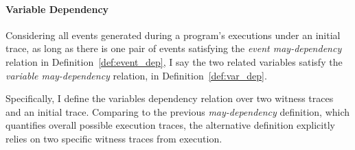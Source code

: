 \paragraph*{Variable Dependency}
{Considering 
all events generated during a program's executions
under an initial trace,
as long as there is one pair of events satisfying the \emph{event may-dependency} relation in Definition~\ref{def:event_dep}, 
 I say the two 
related
variables satisfy the \emph{variable may-dependency} relation, in Definition~\ref{def:var_dep}.
}
\begin{defn}
    \label{def:var_dep}
    \end{defn}
    Specifically, I define the variables dependency relation over two witness traces and an initial trace. Comparing to 
    the previous \emph{may-dependency} definition, which quantifies overall possible execution traces, the alternative
    definition explicitly relies on two specific witness traces from execution.

